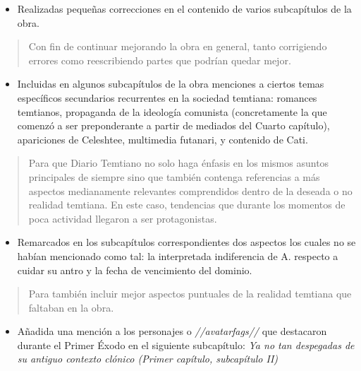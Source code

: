 \documentclass[
  spanish,
]{book}
\providecommand{\tightlist}{%
  \setlength{\itemsep}{0pt}\setlength{\parskip}{0pt}}
\begin{document}
\begin{itemize}
\tightlist
\item
  Realizadas pequeñas correcciones en el contenido de varios subcapítulos de la obra.
\end{itemize}

\begin{quote}
Con fin de continuar mejorando la obra en general, tanto corrigiendo errores como reescribiendo partes que podrían quedar mejor.
\end{quote}

\begin{itemize}
\tightlist
\item
  Incluidas en algunos subcapítulos de la obra menciones a ciertos temas específicos secundarios recurrentes en la sociedad temtiana: romances temtianos, propaganda de la ideología comunista (concretamente la que comenzó a ser preponderante a partir de mediados del Cuarto capítulo), apariciones de Celeshtee, multimedia futanari, y contenido de Cati.
\end{itemize}

\begin{quote}
Para que Diario Temtiano no solo haga énfasis en los mismos asuntos principales de siempre sino que también contenga referencias a más aspectos medianamente relevantes comprendidos dentro de la deseada o no realidad temtiana. En este caso, tendencias que durante los momentos de poca actividad llegaron a ser protagonistas.
\end{quote}

\begin{itemize}
\tightlist
\item
  Remarcados en los subcapítulos correspondientes dos aspectos los cuales no se habían mencionado como tal: la interpretada indiferencia de A. respecto a cuidar su antro y la fecha de vencimiento del dominio.
\end{itemize}

\begin{quote}
Para también incluir mejor aspectos puntuales de la realidad temtiana que faltaban en la obra.
\end{quote}

\begin{itemize}
\tightlist
\item
  Añadida una mención a los personajes o \emph{//avatarfags//} que destacaron durante el Primer Éxodo en el siguiente subcapítulo: \emph{Ya no tan despegadas de su antiguo contexto clónico (Primer capítulo, subcapítulo II)}
\end{itemize}
\end{document}
